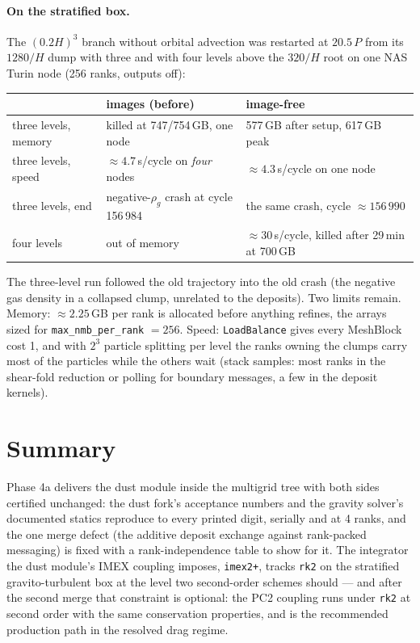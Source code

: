\documentclass[11pt]{article}
\newcommand{\code}[1]{\texttt{#1}}
\begin{document}
\paragraph{On the stratified box.} The $(0.2H)^3$ branch without orbital advection was
restarted at $20.5\,P$ from its $1280/H$ dump with three and with four levels above the
$320/H$ root on one NAS Turin node (256 ranks, outputs off):

\begin{center}\small
\begin{tabular}{lll}
\toprule
 & images (before) & image-free \\
\midrule
three levels, memory & killed at 747/754\,GB, one node & 577\,GB after setup, 617\,GB peak \\
three levels, speed & $\approx 4.7$\,s/cycle on \emph{four} nodes & $\approx 4.3$\,s/cycle on one node \\
three levels, end & negative-$\rho_g$ crash at cycle 156\,984 & the same crash, cycle $\approx 156\,990$ \\
four levels & out of memory & $\approx 30$\,s/cycle, killed after 29\,min at 700\,GB \\
\bottomrule
\end{tabular}
\end{center}

\noindent The three-level run followed the old trajectory into the old crash (the
negative gas density in a collapsed clump, unrelated to the deposits). Two limits remain.
Memory: $\approx 2.25$\,GB per rank is allocated before anything refines, the arrays sized for
\code{max\_nmb\_per\_rank} $= 256$. Speed: \code{LoadBalance} gives every MeshBlock cost 1, and
with $2^3$ particle splitting per level the ranks owning the clumps carry most of the
particles while the others wait (stack samples: most ranks in the shear-fold reduction or
polling for boundary messages, a few in the deposit kernels).

\section{Summary}
\label{sec:summary}

Phase 4a delivers the dust module inside the multigrid tree with both sides
certified unchanged: the dust fork's acceptance numbers and the gravity solver's
documented statics reproduce to every printed digit, serially and at 4 ranks, and
the one merge defect (the additive deposit exchange against rank-packed messaging)
is fixed with a rank-independence table to show for it. The integrator the
dust module's IMEX coupling imposes, \code{imex2+}, tracks \code{rk2} on the stratified
gravito-turbulent box at the level two second-order schemes should --- and after the
second merge that constraint is optional: the PC2 coupling runs under \code{rk2} at
second order with the same conservation properties, and is the recommended
production path in the resolved drag regime.
\end{document}
